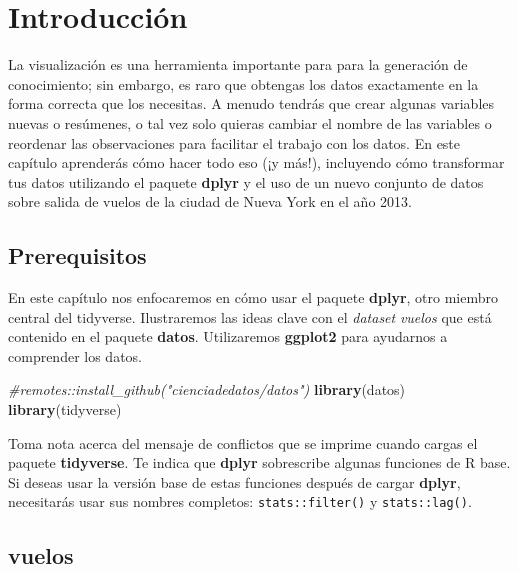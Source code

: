 \documentclass[11pt,oneside]{report}
\newenvironment{Shaded}{\begin{snugshade}}{\end{snugshade}}
\newcommand{\CommentTok}[1]{\textcolor[rgb]{0.56,0.35,0.01}{\textit{#1}}}
\newcommand{\KeywordTok}[1]{\textcolor[rgb]{0.13,0.29,0.53}{\textbf{#1}}}
\newcommand{\NormalTok}[1]{#1}
\begin{document}
\hypertarget{introducciuxf3n-2}{%
\section{Introducción}\label{introducciuxf3n-2}}

La visualización es una herramienta importante para para la generación
de conocimiento; sin embargo, es raro que obtengas los datos exactamente
en la forma correcta que los necesitas. A menudo tendrás que crear
algunas variables nuevas o resúmenes, o tal vez solo quieras cambiar el
nombre de las variables o reordenar las observaciones para facilitar el
trabajo con los datos. En este capítulo aprenderás cómo hacer todo eso
(¡y más!), incluyendo cómo transformar tus datos utilizando el paquete
\textbf{dplyr} y el uso de un nuevo conjunto de datos sobre salida de
vuelos de la ciudad de Nueva York en el año 2013.

\hypertarget{prerequisitos}{%
\subsection{Prerequisitos}\label{prerequisitos}}

En este capítulo nos enfocaremos en cómo usar el paquete \textbf{dplyr},
otro miembro central del tidyverse. Ilustraremos las ideas clave con el
\emph{dataset} \emph{vuelos} que está contenido en el paquete
\textbf{datos}. Utilizaremos \textbf{ggplot2} para ayudarnos a
comprender los datos.

\begin{Shaded}
\begin{Highlighting}[]
\CommentTok{#remotes::install_github("cienciadedatos/datos")}
\KeywordTok{library}\NormalTok{(datos)}
\KeywordTok{library}\NormalTok{(tidyverse)}
\end{Highlighting}
\end{Shaded}

Toma nota acerca del mensaje de conflictos que se imprime cuando cargas
el paquete \textbf{tidyverse}. Te indica que \textbf{dplyr} sobrescribe
algunas funciones de R base. Si deseas usar la versión base de estas
funciones después de cargar \textbf{dplyr}, necesitarás usar sus nombres
completos: \texttt{stats::filter()} y \texttt{stats::lag()}.

\hypertarget{vuelos}{%
\subsection{vuelos}\label{vuelos}}
\end{document}
